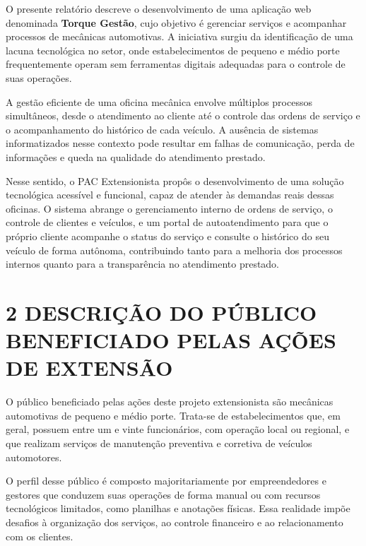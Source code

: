 \documentclass[12pt, a4paper]{article}
\begin{document}
O presente relat\'orio descreve o desenvolvimento de uma aplica\c{c}\~ao web denominada
\textbf{Torque Gest\~ao}, cujo objetivo \'e gerenciar servi\c{c}os e acompanhar processos de
mec\^anicas automotivas. A iniciativa surgiu da identifica\c{c}\~ao de uma lacuna tecnol\'ogica
no setor, onde estabelecimentos de pequeno e m\'edio porte frequentemente operam sem
ferramentas digitais adequadas para o controle de suas opera\c{c}\~oes.

A gest\~ao eficiente de uma oficina mec\^anica envolve m\'ultiplos processos simult\^aneos,
desde o atendimento ao cliente at\'e o controle das ordens de servi\c{c}o e o acompanhamento
do hist\'orico de cada ve\'iculo. A aus\^encia de sistemas informatizados nesse contexto pode
resultar em falhas de comunica\c{c}\~ao, perda de informa\c{c}\~oes e queda na qualidade do
atendimento prestado.

Nesse sentido, o PAC Extensionista prop\^os o desenvolvimento de uma solu\c{c}\~ao tecnol\'ogica
acess\'ivel e funcional, capaz de atender \`as demandas reais dessas oficinas. O sistema abrange
o gerenciamento interno de ordens de servi\c{c}o, o controle de clientes e ve\'iculos, e um
portal de autoatendimento para que o pr\'oprio cliente acompanhe o status do servi\c{c}o e
consulte o hist\'orico do seu ve\'iculo de forma aut\^onoma, contribuindo tanto para a melhoria
dos processos internos quanto para a transpar\^encia no atendimento prestado.
 
\newpage
{}
\label{sec:publico}
\section*{2 DESCRI\c{C}\~AO DO P\'UBLICO BENEFICIADO PELAS A\c{C}\~OES DE EXTENS\~AO}
 
O p\'ublico beneficiado pelas a\c{c}\~oes deste projeto extensionista s\~ao mec\^anicas automotivas
de pequeno e m\'edio porte. Trata-se de estabelecimentos que, em geral, possuem entre um e vinte
funcion\'arios, com opera\c{c}\~ao local ou regional, e que realizam servi\c{c}os de manuten\c{c}\~ao
preventiva e corretiva de ve\'iculos automotores.

O perfil desse p\'ublico \'e composto majoritariamente por empreendedores e gestores que conduzem
suas opera\c{c}\~oes de forma manual ou com recursos tecnol\'ogicos limitados, como planilhas e
anota\c{c}\~oes f\'isicas. Essa realidade imp\~oe desafios \`a organiza\c{c}\~ao dos servi\c{c}os,
ao controle financeiro e ao relacionamento com os clientes.
\end{document}
